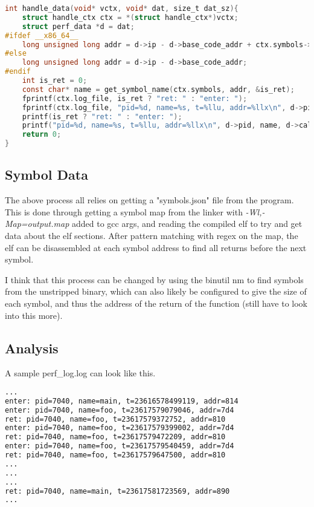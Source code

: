 \documentclass[a4paper, 12pt, english]{article}
\begin{document}
\begin{lstlisting}[language=C, basicstyle=\ttfamily, frame=single]
int handle_data(void* vctx, void* dat, size_t dat_sz){
    struct handle_ctx ctx = *(struct handle_ctx*)vctx;
    struct perf_data *d = dat;
#ifdef __x86_64__
    long unsigned long addr = d->ip - d->base_code_addr + ctx.symbols->offset;
#else
    long unsigned long addr = d->ip - d->base_code_addr;
#endif
    int is_ret = 0;
    const char* name = get_symbol_name(ctx.symbols, addr, &is_ret);
    fprintf(ctx.log_file, is_ret ? "ret: " : "enter: ");
    fprintf(ctx.log_file, "pid=%d, name=%s, t=%llu, addr=%llx\n", d->pid, name, d->call_time, addr); 
    printf(is_ret ? "ret: " : "enter: ");
    printf("pid=%d, name=%s, t=%llu, addr=%llx\n", d->pid, name, d->call_time, addr); 
    return 0;
}
\end{lstlisting}

\subsection{Symbol Data}
The above process all relies on getting a "symbols.json" file from the program. This is done through getting a symbol map from the linker with \textit{-Wl,-Map=output.map} added to gcc args, and reading the compiled elf to try and get data about the elf sections. After pattern matching with regex on the map, the elf can be disassembled at each symbol address to find all returns before the next symbol. 

I think that this process can be changed by using the binutil nm to find symbols from the unstripped binary, which can also likely be configured to give the size of each symbol, and thus the address of the return of the function (still have to look into this more).

\subsection{Analysis}
A sample perf\_log.log can look like this.
\begin{lstlisting}[language=sh]
...
enter: pid=7040, name=main, t=23616578499119, addr=814
enter: pid=7040, name=foo, t=23617579079046, addr=7d4
ret: pid=7040, name=foo, t=23617579372752, addr=810
enter: pid=7040, name=foo, t=23617579399002, addr=7d4
ret: pid=7040, name=foo, t=23617579472209, addr=810
enter: pid=7040, name=foo, t=23617579540459, addr=7d4
ret: pid=7040, name=foo, t=23617579647500, addr=810
...
...
...
ret: pid=7040, name=main, t=23617581723569, addr=890
...
\end{lstlisting}
\end{document}
